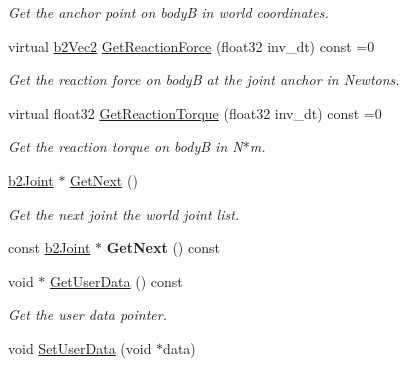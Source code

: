 \begin{DoxyCompactItemize}
\begin{DoxyCompactList}\small\item\em Get the anchor point on body\-B in world coordinates. \end{DoxyCompactList}\item 
\hypertarget{classb2_joint_a7e0eddefb9b69ad050b8ef6425838a74}{virtual \hyperlink{structb2_vec2}{b2\-Vec2} \hyperlink{classb2_joint_a7e0eddefb9b69ad050b8ef6425838a74}{Get\-Reaction\-Force} (float32 inv\-\_\-dt) const =0}\label{classb2_joint_a7e0eddefb9b69ad050b8ef6425838a74}

\begin{DoxyCompactList}\small\item\em Get the reaction force on body\-B at the joint anchor in Newtons. \end{DoxyCompactList}\item 
\hypertarget{classb2_joint_ae355e441c2aa842777dc04e24f15ced0}{virtual float32 \hyperlink{classb2_joint_ae355e441c2aa842777dc04e24f15ced0}{Get\-Reaction\-Torque} (float32 inv\-\_\-dt) const =0}\label{classb2_joint_ae355e441c2aa842777dc04e24f15ced0}

\begin{DoxyCompactList}\small\item\em Get the reaction torque on body\-B in N$\ast$m. \end{DoxyCompactList}\item 
\hypertarget{classb2_joint_a1a0e2137b631010750c728cb4e276e5d}{\hyperlink{classb2_joint}{b2\-Joint} $\ast$ \hyperlink{classb2_joint_a1a0e2137b631010750c728cb4e276e5d}{Get\-Next} ()}\label{classb2_joint_a1a0e2137b631010750c728cb4e276e5d}

\begin{DoxyCompactList}\small\item\em Get the next joint the world joint list. \end{DoxyCompactList}\item 
\hypertarget{classb2_joint_a1ac83edb39806085608c9d549dd98550}{const \hyperlink{classb2_joint}{b2\-Joint} $\ast$ {\bfseries Get\-Next} () const }\label{classb2_joint_a1ac83edb39806085608c9d549dd98550}

\item 
\hypertarget{classb2_joint_a505ab02c234f1cc20aa3375f3ab7b587}{void $\ast$ \hyperlink{classb2_joint_a505ab02c234f1cc20aa3375f3ab7b587}{Get\-User\-Data} () const }\label{classb2_joint_a505ab02c234f1cc20aa3375f3ab7b587}

\begin{DoxyCompactList}\small\item\em Get the user data pointer. \end{DoxyCompactList}\item 
\hypertarget{classb2_joint_a492f2d02496437572aaec6013ebdc1c8}{void \hyperlink{classb2_joint_a492f2d02496437572aaec6013ebdc1c8}{Set\-User\-Data} (void $\ast$data)}\label{classb2_joint_a492f2d02496437572aaec6013ebdc1c8}


\end{DoxyCompactItemize}
